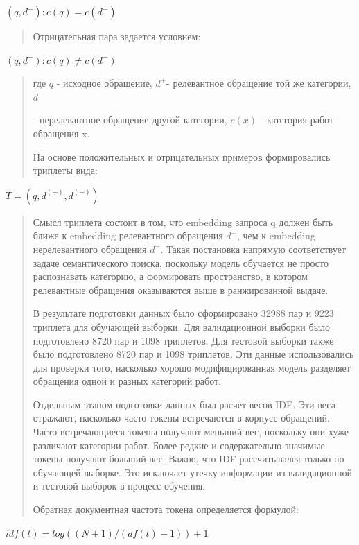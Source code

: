 \(\left( q,d^{+} \right):c(q) = c\left( d^{+} \right)\)

\begin{quote}
Отрицательная пара задается условием:
\end{quote}

\(\left( q,d^{-} \right):c(q) \neq c\left( d^{-} \right)\)

\begin{quote}
где \(q\) - исходное обращение, \(d^{+}\)- релевантное обращение той же
категории, \(d^{-}\)

- нерелевантное обращение другой категории, \(c(x)\) - категория работ
обращения x.

На основе положительных и отрицательных примеров формировались триплеты
вида:
\end{quote}

\(T = \left( q,d^{( + )},d^{( - )} \right)\)

\begin{quote}
Смысл триплета состоит в том, что embedding запроса q должен быть ближе
к embedding релевантного обращения \(d^{+}\), чем к embedding
нерелевантного обращения \(d^{-}\). Такая постановка напрямую
соответствует задаче семантического поиска, поскольку модель обучается
не просто распознавать категорию, а формировать пространство, в котором
релевантные обращения оказываются выше в ранжированной выдаче.

В результате подготовки данных было сформировано 32988 пар и 9223
триплета для обучающей выборки. Для валидационной выборки было
подготовлено 8720 пар и 1098 триплетов. Для тестовой выборки также было
подготовлено 8720 пар и 1098 триплетов. Эти данные использовались для
проверки того, насколько хорошо модифицированная модель разделяет
обращения одной и разных категорий работ.

Отдельным этапом подготовки данных был расчет весов IDF. Эти веса
отражают, насколько часто токены встречаются в корпусе обращений. Часто
встречающиеся токены получают меньший вес, поскольку они хуже различают
категории работ. Более редкие и содержательно значимые токены получают
больший вес. Важно, что IDF рассчитывался только по обучающей выборке.
Это исключает утечку информации из валидационной и тестовой выборок в
процесс обучения.

Обратная документная частота токена определяется формулой:
\end{quote}

\(idf(t) = log\left( (N + 1)/\left( df(t) + 1 \right) \right) + 1\)

